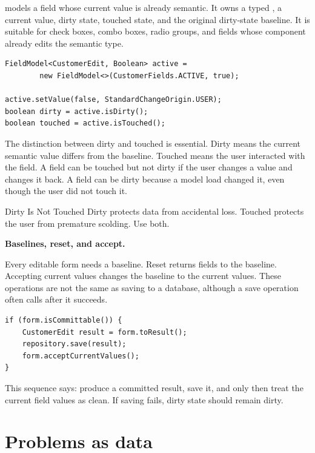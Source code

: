  models a field whose current value is already semantic.
It owns a typed , a current value, dirty state, touched state, and
the original dirty-state baseline. It is suitable for check boxes, combo boxes,
radio groups, and fields whose component already edits the semantic type.

\begin{lstlisting}[caption={A semantic field model for a checkbox.}]
FieldModel<CustomerEdit, Boolean> active =
        new FieldModel<>(CustomerFields.ACTIVE, true);

active.setValue(false, StandardChangeOrigin.USER);
boolean dirty = active.isDirty();
boolean touched = active.isTouched();
\end{lstlisting}

The distinction between dirty and touched is essential. Dirty means the current
semantic value differs from the baseline. Touched means the user interacted with
the field. A field can be touched but not dirty if the user changes a value and
changes it back. A field can be dirty because a model load changed it, even
though the user did not touch it.

\begin{principlebox}{Dirty Is Not Touched}
Dirty protects data from accidental loss. Touched protects the user from
premature scolding. Use both.
\end{principlebox}

\textbf{Baselines, reset, and accept.}

Every editable form needs a baseline. Reset returns fields to the baseline.
Accepting current values changes the baseline to the current values. These
operations are not the same as saving to a database, although a save operation
often calls  after it succeeds.

\begin{lstlisting}[caption={Typical save baseline flow.}]
if (form.isCommittable()) {
    CustomerEdit result = form.toResult();
    repository.save(result);
    form.acceptCurrentValues();
}
\end{lstlisting}

This sequence says: produce a committed result, save it, and only then treat the
current field values as clean. If saving fails, dirty state should remain dirty.

\section{Problems as data}

